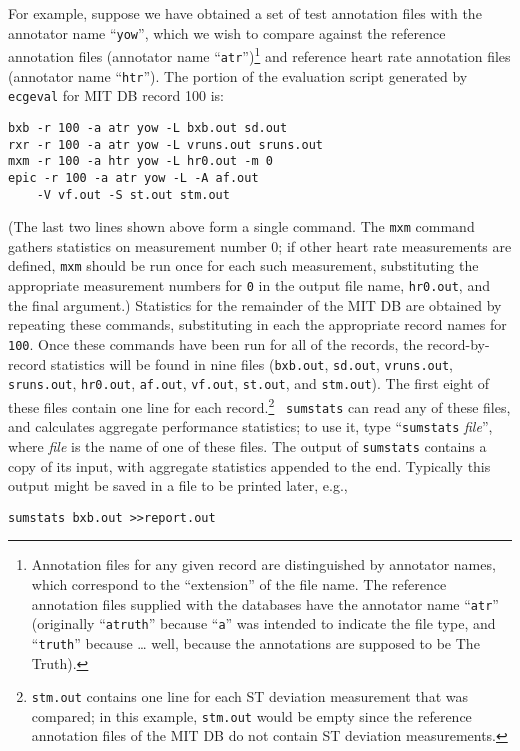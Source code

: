 \documentclass[twoside]{article}
\begin{document}
For example, suppose we have obtained a set of test annotation files with the
annotator name ``{\tt yow}'', which we wish to compare against the reference
annotation files (annotator name ``{\tt atr}'')\footnote{
Annotation files for any given record are distinguished by annotator names,
which correspond to the ``extension'' of the file name.  The
reference annotation files supplied with the databases have the annotator
name ``{\tt atr}'' (originally ``{\tt atruth}'' because ``{\tt a}''
was intended to indicate the file type, and ``{\tt truth}'' because \ldots
well, because the annotations are supposed to be The Truth).}
and reference heart rate annotation files (annotator name ``{\tt htr}'').
The portion of the evaluation script generated by {\tt ecgeval} for MIT DB
record 100 is:
\begin{verbatim}
bxb -r 100 -a atr yow -L bxb.out sd.out
rxr -r 100 -a atr yow -L vruns.out sruns.out
mxm -r 100 -a htr yow -L hr0.out -m 0
epic -r 100 -a atr yow -L -A af.out
    -V vf.out -S st.out stm.out
\end{verbatim}
(The last two lines shown above form a single command.  The {\tt mxm} command
gathers statistics on measurement number 0; if other heart rate measurements
are defined, {\tt mxm} should be run once for each such measurement,
substituting the appropriate measurement numbers for {\tt 0} in the output
file name, {\tt hr0.out}, and the final argument.)  Statistics for the
remainder of the MIT DB are obtained by repeating these commands, substituting
in each the appropriate record names for {\tt 100}.  Once these commands have
been run for all of the records, the record-by-record statistics will be found
in nine files ({\tt bxb.out}, {\tt sd.out}, {\tt vruns.out}, {\tt sruns.out},
{\tt hr0.out}, {\tt af.out}, {\tt vf.out}, {\tt st.out}, and {\tt stm.out}).
The first eight of these files contain one line for each record.\footnote{
{\tt stm.out} contains one line for each ST deviation measurement that was
compared; in this example, {\tt stm.out} would be empty since the reference
annotation files of the MIT DB do not contain ST deviation measurements.} {\tt
sumstats} can read any of these files, and calculates aggregate performance
statistics; to use it, type ``{\tt sumstats} {\it file}'', where {\it file} is
the name of one of these files.  The output of {\tt sumstats} contains a copy
of its input, with aggregate statistics appended to the end.  Typically this
output might be saved in a file to be printed later, e.g.,
\begin{verbatim}
sumstats bxb.out >>report.out
\end{verbatim}
\end{document}
